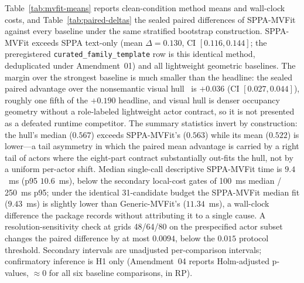\documentclass[11pt,a4paper]{article}
\begin{document}
Table~\ref{tab:mvfit-means} reports clean-condition method means and
wall-clock costs, and Table~\ref{tab:paired-deltas} the sealed paired
differences of SPPA-MVFit against every baseline under the same stratified
bootstrap construction. SPPA-MVFit exceeds SPPA text-only (mean
\(\Delta=0.130\), CI \([0.116,0.144]\); the preregistered
\texttt{curated\_family\_template} row is this identical method,
deduplicated under Amendment~01) and all lightweight geometric baselines. The margin over the
strongest baseline is much smaller than the headline: the sealed paired
advantage over the nonsemantic visual hull~\cite{laurentini1994visual} is
\(+0.036\) (CI \([0.027,0.044]\)), roughly one fifth of the \(+0.190\)
headline, and visual hull is denser occupancy geometry without a
role-labeled lightweight actor contract, so it is not presented as a
defeated runtime competitor. The summary statistics invert by construction:
the hull's median (\(0.567\)) exceeds SPPA-MVFit's (\(0.563\)) while its
mean (\(0.522\)) is lower---a tail asymmetry in which the paired mean
advantage is carried by a right tail of actors where the eight-part
contract substantially out-fits the hull, not by a uniform per-actor shift.
Median single-call descriptive
SPPA-MVFit time is \(9.4\)~ms (p95 \(10.6\)~ms), below the secondary
local-cost gates of 100~ms median / 250~ms p95; under the identical
31-candidate budget the SPPA-MVFit median fit (\(9.43\)~ms) is slightly
lower than Generic-MVFit's (\(11.34\)~ms), a wall-clock difference the
package records without attributing it to a single cause. A
resolution-sensitivity check
at grids 48/64/80 on the prespecified actor subset changes the paired
difference by at most \(0.0094\), below the \(0.015\) protocol threshold.
Secondary intervals are unadjusted per-comparison intervals; confirmatory
inference is H1 only (Amendment~04 reports Holm-adjusted p-values,
\(\approx 0\) for all six baseline comparisons, in RP).

\begin{table}[H]
\centering
\footnotesize
\caption{Clean-mask method summary on the held-out test (\(n{=}240\)). Mean/median
are 64-cubed voxel IoU. Timings are single-call wall-clock milliseconds on the
benchmark machine and are not Unreal frame times.}
\label{tab:mvfit-means}

\end{table}

\begin{table}[H]
\centering
\footnotesize
\caption{Sealed paired differences of SPPA-MVFit against every baseline on
the held-out test (clean 64-cubed voxel IoU, \(n{=}240\), stratified
bootstrap, 10{,}000 resamples, seed 77157; all deltas sealed in
\texttt{confirmatory\_summary.json}). Means and medians are recomputed
read-only from the sealed \texttt{raw\_metrics.csv}.}
\label{tab:paired-deltas}

\end{table}
\end{document}
